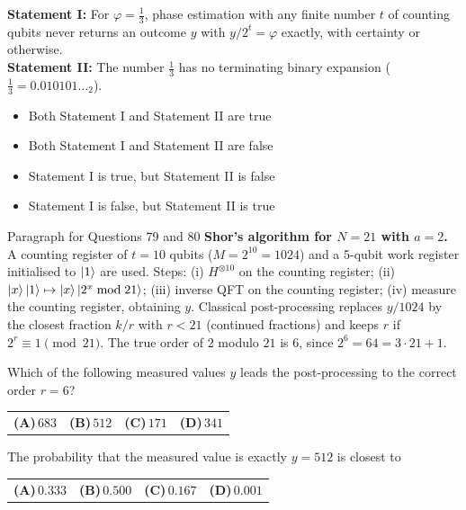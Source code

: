 \documentclass[11pt,a4paper]{article}
\newcommand{\optlabel}[1]{\textbf{(#1)}}
\newenvironment{qitem}[1]{\begin{list}{}{\setlength{\leftmargin}{3.3em}\setlength{\labelwidth}{3.1em}%
  \setlength{\labelsep}{0.2em}\setlength{\topsep}{3pt}\setlength{\parsep}{3pt}}\item[\textbf{Q.#1}\hfill]}{\end{list}}
\newcommand{\qsep}{\par\vspace{2pt}{\color{black!15}\hrule}\vspace{4pt}}
\begin{document}
\begin{qitem}{78}
\textbf{Statement I:} For $\varphi = \frac13$, phase estimation with any finite number $t$ of counting qubits never returns an
outcome $y$ with $y/2^t = \varphi$ exactly, with certainty or otherwise.\\[1mm]
\textbf{Statement II:} The number $\frac13$ has no terminating binary expansion ($\frac13 = 0.010101\ldots_2$).
\begin{itemize}[leftmargin=2.6em, labelsep=0.4em, itemsep=2pt, topsep=3pt]
\item[\optlabel{A}] Both Statement I and Statement II are true
\item[\optlabel{B}] Both Statement I and Statement II are false
\item[\optlabel{C}] Statement I is true, but Statement II is false
\item[\optlabel{D}] Statement I is false, but Statement II is true
\end{itemize}
\end{qitem}
\qsep

\begin{passagebox}{Paragraph for Questions 79 and 80}
\textbf{Shor's algorithm for $N = 21$ with $a = 2$.} A counting register of $t = 10$ qubits ($M = 2^{10} = 1024$) and a
5-qubit work register initialised to $\ket{1}$ are used. Steps: (i) $H^{\otimes 10}$ on the counting register;
(ii) $\ket{x}\ket{1} \mapsto \ket{x}\ket{2^x \bmod 21}$; (iii) inverse QFT on the counting register; (iv) measure the counting
register, obtaining $y$. Classical post-processing replaces $y/1024$ by the closest fraction $k/r$ with $r < 21$ (continued
fractions) and keeps $r$ if $2^r \equiv 1 \pmod{21}$. The true order of $2$ modulo $21$ is $6$, since $2^6 = 64 = 3\cdot21 + 1$.
\end{passagebox}
\begin{qitem}{79}
Which of the following measured values $y$ leads the post-processing to the correct order $r = 6$?
\par\smallskip\noindent\begin{tabularx}{\linewidth}{@{}*{4}{L}@{}}
\optlabel{A}\,$683$ & \optlabel{B}\,$512$ & \optlabel{C}\,$171$ & \optlabel{D}\,$341$
\end{tabularx}
\end{qitem}
\qsep

\begin{qitem}{80}
The probability that the measured value is exactly $y = 512$ is closest to
\par\smallskip\noindent\begin{tabularx}{\linewidth}{@{}*{4}{L}@{}}
\optlabel{A}\,$0.333$ & \optlabel{B}\,$0.500$ & \optlabel{C}\,$0.167$ & \optlabel{D}\,$0.001$
\end{tabularx}
\end{qitem}
\qsep

\newpage
\end{document}
